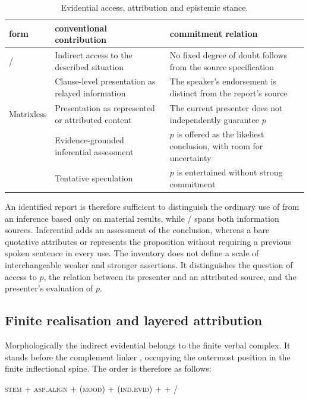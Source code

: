 \begin{table}[htbp]
\footnotesize
\caption{Evidential access, attribution and epistemic stance.}
\label{tab:evidential-semantic-inventory}
\begin{tabularx}{\textwidth}{l L L}
\toprule
{\sc form} & {\sc conventional contribution} & {\sc commitment relation} \\
\midrule
{}/ & Indirect access to the described situation &
No fixed degree of doubt follows from the source specification \\
 & Clause-level presentation as relayed information &
The speaker's endorsement is distinct from the report's source \\
Matrixless  & Presentation as represented or attributed content &
The current presenter does not independently guarantee $p$ \\
 & Evidence-grounded inferential assessment &
$p$ is offered as the likeliest conclusion, with room for uncertainty \\
 & Tentative speculation &
$p$ is entertained without strong commitment \\
\bottomrule
\end{tabularx}
\end{table}

An identified report is therefore sufficient to distinguish the ordinary
use of  from an inference based only on material results, while
/ spans both information sources. Inferential
 adds an assessment of the conclusion, whereas a bare quotative
attributes or represents the proposition without requiring a previous
spoken sentence in every use. The inventory does not define a scale of
interchangeable weaker and stronger assertions. It distinguishes the
question of access to $p$, the relation between its presenter and an
attributed source, and the presenter's evaluation of $p$.

\subsection{Finite realisation and layered attribution}

Morphologically the indirect evidential belongs to the finite verbal complex. It
stands before the complement linker , occupying the outermost position
in the finite inflectional spine. The order is therefore as follows:

\begin{center}
\textsc{stem} + \textsc{asp.align} + (\textsc{mood}) + (\textsc{ind.evid}) +
 + /
\end{center}


